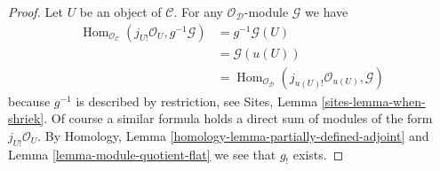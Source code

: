\documentclass[10pt,a4paper]{amsart}
\theoremstyle{plain}
\theoremstyle{definition}
\theoremstyle{remark}
\numberwithin{equation}{subsection}
\def\Hom{\mathop{\mathrm{Hom}}\nolimits}
\begin{document}
\begin{proof}
Let $U$ be an object of $\mathcal{C}$. For any
$\mathcal{O}_\mathcal{D}$-module $\mathcal{G}$ we have
\begin{align*}
\Hom_{\mathcal{O}_\mathcal{C}}(j_{U!}\mathcal{O}_U, g^{-1}\mathcal{G})
& =
g^{-1}\mathcal{G}(U) \\
& =
\mathcal{G}(u(U)) \\
& =
\Hom_{\mathcal{O}_\mathcal{D}}(j_{u(U)!}\mathcal{O}_{u(U)}, \mathcal{G})
\end{align*}
because $g^{-1}$ is described by restriction, see
Sites, Lemma \ref{sites-lemma-when-shriek}.
Of course a similar formula holds a direct sum of modules
of the form $j_{U!}\mathcal{O}_U$. By
Homology, Lemma \ref{homology-lemma-partially-defined-adjoint}
and
Lemma \ref{lemma-module-quotient-flat}
we see that $g_!$ exists.
\end{proof}
\end{document}
